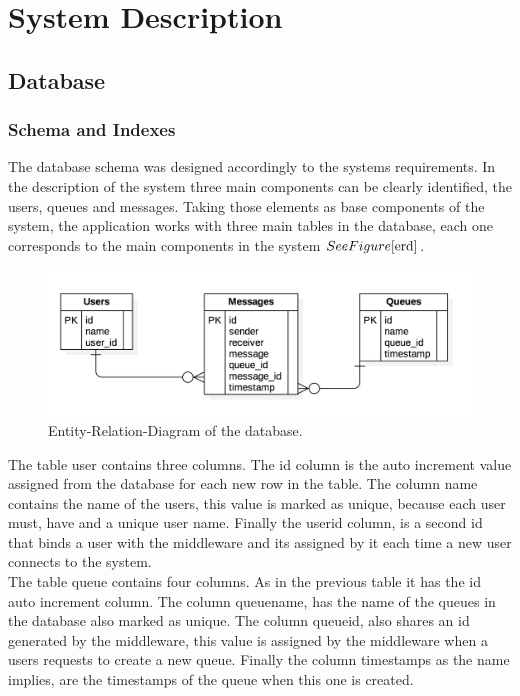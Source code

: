 \section{System Description}\label{sec:system-description}

\subsection{Database}\label{sec:database}

\subsubsection{Schema and Indexes}\label{sec:schema-and-indexes}
The database schema was designed accordingly to the systems requirements. In the description of the system three main components can be clearly identified, the users, queues and messages. Taking those elements as base components of the system, the application works with three main tables in the database, each one corresponds to the main components in the system \( See Figure \ref{erd} \).\\

\begin{figure}[h!]
	\centering
	\includegraphics[width=\textwidth]{ERDDiagram1.png}
	\caption{Entity-Relation-Diagram of the database.}
	\label{erd}
\end{figure}


The table user contains three columns. The id column is the auto increment value assigned from the database for each new row in the table. The column name contains the name of the users, this value is marked as unique, because each user must, have and a unique user name. Finally the userid column, is a second id that binds a user with the middleware and its assigned by it each time a new user connects to the system.\\

The table queue contains four columns. As in the previous table it has the id auto increment column. The column queuename, has the name of the queues in the database also marked as unique. The column queueid, also shares an id generated by the middleware, this value is assigned by the middleware when a users requests to create a new queue. Finally the column timestamps as the name implies, are the timestamps of the queue when this one is created.\\

